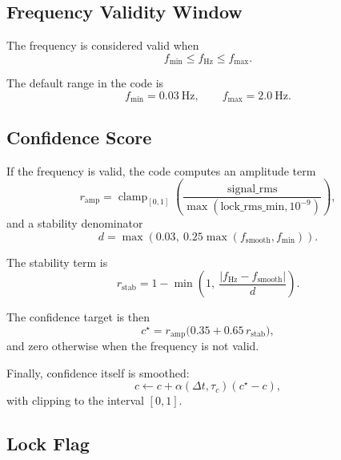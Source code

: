 \documentclass[conference]{IEEEtran}
\begin{document}
    \subsection{Frequency Validity Window}

    The frequency is considered valid when
    \begin{equation}
        f_{\min} \le f_{\text{Hz}} \le f_{\max}.
    \end{equation}

    The default range in the code is
    \begin{equation}
        f_{\min} = 0.03~\text{Hz}, \qquad
        f_{\max} = 2.0~\text{Hz}.
    \end{equation}

    \subsection{Confidence Score}

    If the frequency is valid, the code computes an amplitude term
    \begin{equation}
        r_{\text{amp}} =
        \operatorname{clamp}_{[0,1]}
        \left(
        \frac{\text{signal\_rms}}
        {\max(\text{lock\_rms\_min},10^{-9})}
        \right),
    \end{equation}
    and a stability denominator
    \begin{equation}
        d = \max\!\left(0.03,\ 0.25\max(f_{\text{smooth}}, f_{\min})\right).
    \end{equation}

    The stability term is
    \begin{equation}
        r_{\text{stab}} =
        1 - \min\!\left(1,\ \frac{|f_{\text{Hz}}-f_{\text{smooth}}|}{d}\right).
    \end{equation}

    The confidence target is then
    \begin{equation}
        c^\star =
        r_{\text{amp}}\bigl(0.35 + 0.65\,r_{\text{stab}}\bigr),
    \end{equation}
    and zero otherwise when the frequency is not valid.

    Finally, confidence itself is smoothed:
    \begin{equation}
        c \leftarrow c + \alpha(\Delta t,\tau_c)(c^\star - c),
    \end{equation}
    with clipping to the interval $[0,1]$.

    \subsection{Lock Flag}
\end{document}
